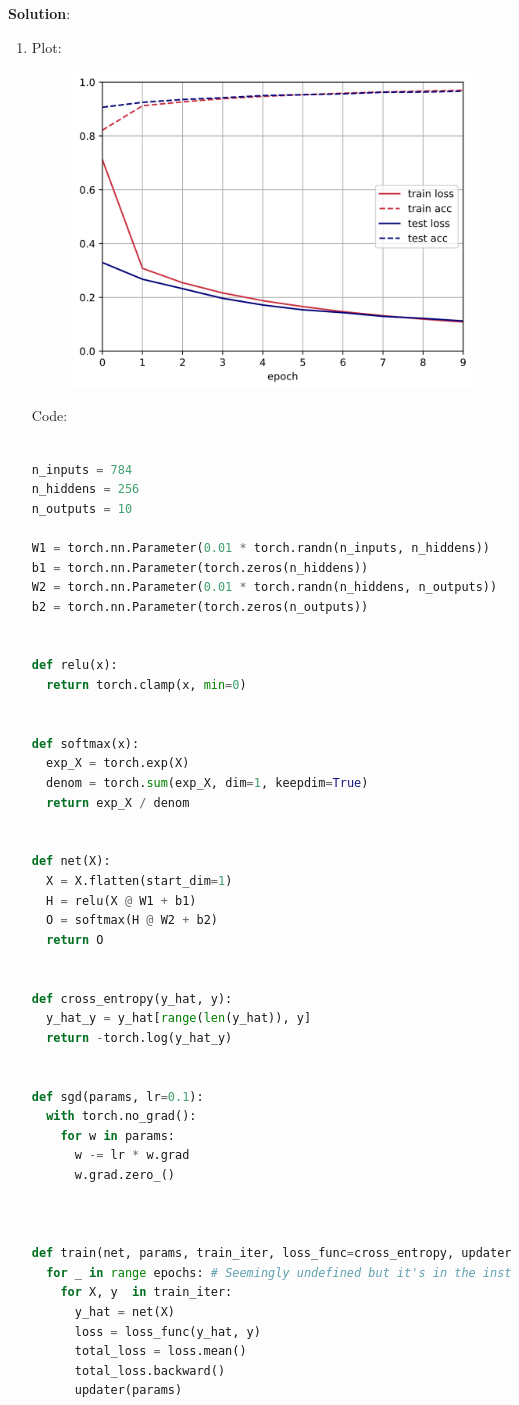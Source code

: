 \documentclass[submit]{../harvardml}
\newenvironment{answer}{
    \vspace{2mm}
    \color{blue}\noindent\textbf{Solution}:
}{}
\begin{document}
\begin{answer}

  \begin{enumerate}
    \item[1.]

      Plot:
      
      \begin{figure}[H]
        \centering
        \includegraphics[width=0.5\linewidth]{nn_accuracy.png}
    \end{figure}

      Code:

      \begin{lstlisting}[language=Python]

n_inputs = 784 
n_hiddens = 256
n_outputs = 10

W1 = torch.nn.Parameter(0.01 * torch.randn(n_inputs, n_hiddens)) 
b1 = torch.nn.Parameter(torch.zeros(n_hiddens)) 
W2 = torch.nn.Parameter(0.01 * torch.randn(n_hiddens, n_outputs))
b2 = torch.nn.Parameter(torch.zeros(n_outputs))


def relu(x):
  return torch.clamp(x, min=0)


def softmax(x):
  exp_X = torch.exp(X)
  denom = torch.sum(exp_X, dim=1, keepdim=True)
  return exp_X / denom


def net(X):
  X = X.flatten(start_dim=1)
  H = relu(X @ W1 + b1)
  O = softmax(H @ W2 + b2)
  return O


def cross_entropy(y_hat, y):
  y_hat_y = y_hat[range(len(y_hat)), y]
  return -torch.log(y_hat_y)


def sgd(params, lr=0.1):
  with torch.no_grad():
    for w in params:
      w -= lr * w.grad
      w.grad.zero_()



def train(net, params, train_iter, loss_func=cross_entropy, updater=sgd):
  for _ in range epochs: # Seemingly undefined but it's in the instructions
    for X, y  in train_iter:
      y_hat = net(X)
      loss = loss_func(y_hat, y)
      total_loss = loss.mean()
      total_loss.backward()
      updater(params)



\end{lstlisting}
\end{enumerate}
\end{answer}
\end{document}
